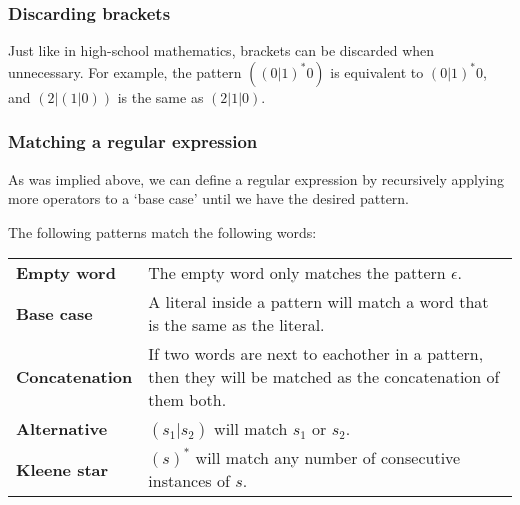 
\subsubsection{Discarding brackets}

Just like in high-school mathematics, brackets can be discarded when
unnecessary. For example, the pattern $((0|1)^*0)$ is equivalent to $(0|1)^*0$,
and $(2|(1|0))$ is the same as $(2|1|0)$.

\subsubsection{Matching a regular expression}

As was implied above, we can define a regular expression by recursively
applying more operators to a `base case' until we have the desired pattern.

The following patterns match the following words:

\begin{center}
	\begin{tabular}{>{\bfseries} l l}
		Empty word & The empty word only matches the pattern $\epsilon$.\\
		Base case & A literal inside a pattern will match a word that is the
					same as the literal.\\
		Concatenation & If two words are next to eachother in a pattern, then
						they will be matched as the concatenation of them
						both.\\
		Alternative & $(s_1|s_2)$ will match $s_1$ or $s_2$.\\
		Kleene star & $(s)^*$ will match any number of consecutive instances of
					  $s$.
	\end{tabular}
\end{center}